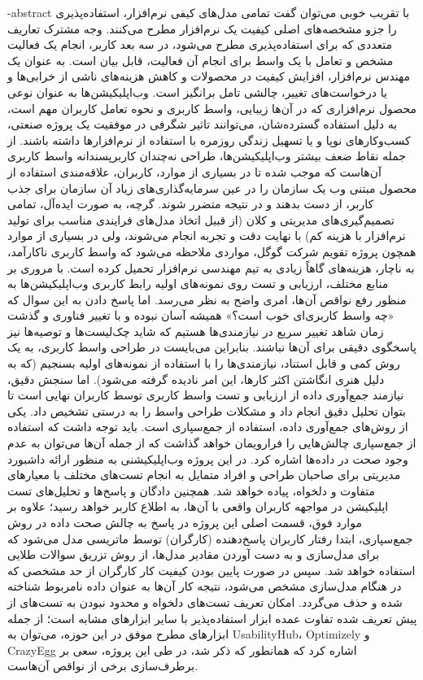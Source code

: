 \fa-abstract{
	با تقریب خوبی می‌توان گفت تمامی مدل‌های کیفی نرم‌افزار، استفاده‌پذیری را جزو مشخصه‌های اصلی کیفیت یک نرم‌افزار مطرح می‌کنند. وجه مشترک تعاریف متعددی که برای استفاده‌پذیری مطرح می‌شود، در سه بعد کاربر، انجام یک فعالیت مشخص و تعامل با یک واسط برای انجام آن فعالیت، قابل بیان است. به عنوان یک مهندس نرم‌افزار، افزایش کیفیت در محصولات و کاهش هزینه‌های ناشی از خرابی‌ها و یا درخواست‌های تغییر، چالشی تامل برانگیز است. وب‌اپلیکیشن‌ها به عنوان نوعی محصول نرم‌افزاری که در آن‌ها زیبایی، واسط کاربری و نحوه تعامل کاربران مهم است، به دلیل استفاده گسترده‌شان، می‌توانند تاثیر شگرفی در موفقیت یک پروژه صنعتی، کسب‌وکارهای نوپا و یا تسهیل زندگی روزمره با استفاده از نرم‌افزارها داشته باشند. از جمله نقاط ضعف بیشتر وب‌اپلیکیشن‌ها، طراحی نه‌چندان کاربرپسندانه واسط کاربری آن‌هاست که موجب شده تا در بسیاری از موارد، کاربران، علاقه‌مندی استفاده از محصول مبتنی وب یک سازمان را در عین سرمایه‌گذاری‌های زیاد آن سازمان برای جذب کاربر، از دست بدهند و در نتیجه متضرر شوند. گرچه، به صورت ایده‌آل، تمامی تصمیم‌گیری‌های مدیریتی و کلان (از قبیل اتخاذ مدل‌های فرایندی مناسب برای تولید نرم‌افزار با هزینه کم) با نهایت دقت و تجربه انجام می‌شوند، ولی در بسیاری از موارد همچون پروژه تقویم شرکت گوگل، مواردی ملاحظه می‌شود که واسط کاربری ناکارآمد، به ناچار، هزینه‌های گاهاً زیادی به تیم مهندسی نرم‌افزار تحمیل کرده است. با مروری بر منابع مختلف، ارزیابی و تست روی نمونه‌های اولیه رابط کاربری وب‌اپلیکیشن‌ها به منظور رفع نواقص آن‌ها، امری واضح به نظر می‌رسد. اما پاسخ دادن به این سوال که «چه واسط کاربری‌ای خوب است؟» همیشه آسان نبوده و با تغییر فناوری و گذشت زمان شاهد تغییر سریع در نیازمندی‌ها هستیم که شاید چک‌لیست‌ها و توصیه‌ها نیز پاسخگوی دقیقی برای آن‌ها نباشند. بنابراین می‌بایست در طراحی واسط کاربری، به یک روش کمی و قابل استناد، نیازمندی‌ها را با استفاده از نمونه‌های اولیه بسنجیم (که به دلیل هنری انگاشتن اکثر کارها، این امر نادیده گرفته می‌شود). اما سنجش دقیق، نیازمند جمع‌آوری داده از ارزیابی و تست واسط کاربری توسط کاربران نهایی است تا بتوان تحلیل دقیق انجام داد و مشکلات طراحی واسط را به درستی تشخیص داد. یکی از روش‌های جمع‌آوری داده، استفاده از جمع‌سپاری است. باید توجه داشت که استفاده از جمع‌سپاری چالش‌هایی را فرارویمان خواهد گذاشت که از جمله آن‌ها می‌توان به عدم وجود صحت در داده‌ها اشاره کرد. در این پروژه وب‌اپلیکیشنی به منظور ارائه داشبورد مدیریتی برای صاحبان طراحی و افراد متمایل به انجام تست‌های مختلف با معیارهای متفاوت و دلخواه، پیاده خواهد شد. همچنین دادگان و پاسخ‌ها و تحلیل‌های تست اپلیکیشن در مواجهه کاربران واقعی با آن‌ها، به اطلاع کاربر خواهد رسید؛ علاوه بر موارد فوق، قسمت اصلی این پروژه در پاسخ به چالش صحت داده در روش جمع‌سپاری، ابتدا رفتار کاربران پاسخ‌دهنده (کارگران) توسط ماتریسی مدل می‌شود که برای مدل‌سازی و به دست آوردن مقادیر مدل‌ها، از روش تزریق سوالات طلایی استفاده خواهد شد. سپس در صورت پایین بودن کیفیت کار کارگران از حد مشخصی که در هنگام مدل‌سازی مشخص می‌شود، نتیجه کار آن‌ها به عنوان داده نامربوط شناخته شده و حذف می‌گردد. امکان تعریف تست‌های دلخواه و محدود نبودن به تست‌های از پیش تعریف شده تفاوت عمده ابزار استفاده‌پذیر با سایر ابزارهای مشابه است؛ از جمله ابزارهای مطرح موفق در این حوزه، می‌توان به UsabilityHub، Optimizely و CrazyEgg اشاره کرد که همانطور که ذکر شد، در طی این پروژه، سعی بر برطرف‌سازی برخی از نواقص آن‌هاست.
}





\AUTtitle
